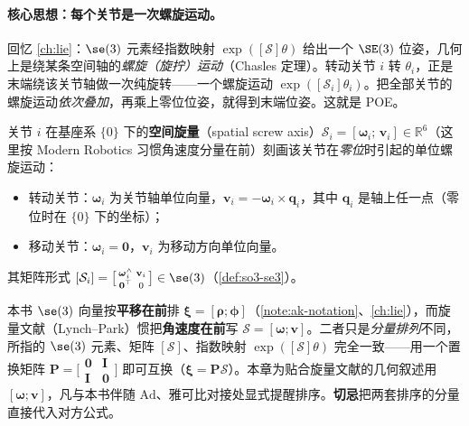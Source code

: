 \paragraph{核心思想：每个关节是一次螺旋运动。}
回忆 \cref{ch:lie}：$\se(3)$ 元素经指数映射 $\exp([\mathcal{S}]\theta)$ 给出一个 $\SE(3)$ 位姿，几何上是绕某条空间轴的\emph{螺旋（旋拧）运动}（Chasles 定理）。转动关节 $i$ 转 $\theta_i$，正是末端绕该关节轴做一次纯旋转——一个螺旋运动 $\exp([\mathcal{S}_i]\theta_i)$。把全部关节的螺旋运动\emph{依次叠加}，再乘上零位位姿，就得到末端位姿。这就是 POE。

\begin{definition}\label{def:ak-screw}
关节 $i$ 在基座系 $\{0\}$ 下的\textbf{空间旋量}（spatial screw axis）$\mathcal{S}_i=[\boldsymbol{\omega}_i;\,\mathbf{v}_i]\in\mathbb{R}^6$（这里按 Modern Robotics 习惯角速度分量在前）刻画该关节在\emph{零位}时引起的单位螺旋运动\cite{lynch2017modern}：
\begin{itemize}
  \item 转动关节：$\boldsymbol{\omega}_i$ 为关节轴单位向量，$\mathbf{v}_i=-\boldsymbol{\omega}_i\times\mathbf{q}_i$，其中 $\mathbf{q}_i$ 是轴上任一点（零位时在 $\{0\}$ 下的坐标）；
  \item 移动关节：$\boldsymbol{\omega}_i=\mathbf{0}$，$\mathbf{v}_i$ 为移动方向单位向量。
\end{itemize}
其矩阵形式 $[\mathcal{S}_i]=\big[\begin{smallmatrix}\boldsymbol{\omega}_i^\wedge & \mathbf{v}_i\\ \mathbf{0}^\top & 0\end{smallmatrix}\big]\in\se(3)$（\cref{def:so3-se3}）。
\end{definition}

\begin{note}\label{note:ak-screw-order}
本书 $\se(3)$ 向量按\textbf{平移在前}排 $\boldsymbol{\xi}=[\boldsymbol{\rho};\boldsymbol{\phi}]$（\cref{note:ak-notation}、\cref{ch:lie}），而旋量文献（Lynch--Park）惯把\textbf{角速度在前}写 $\mathcal{S}=[\boldsymbol{\omega};\mathbf{v}]$。二者只是\emph{分量排列}不同，所指的 $\se(3)$ 元素、矩阵 $[\mathcal{S}]$、指数映射 $\exp([\mathcal{S}]\theta)$ 完全一致——用一个置换矩阵 $\mathbf{P}=\big[\begin{smallmatrix}\mathbf{0}&\mathbf{I}\\\mathbf{I}&\mathbf{0}\end{smallmatrix}\big]$ 即可互换（$\boldsymbol{\xi}=\mathbf{P}\mathcal{S}$）。本章为贴合旋量文献的几何叙述用 $[\boldsymbol{\omega};\mathbf{v}]$，凡与本书伴随 $\mathrm{Ad}$、雅可比对接处显式提醒排序。\textbf{切忌}把两套排序的分量直接代入对方公式。
\end{note}

